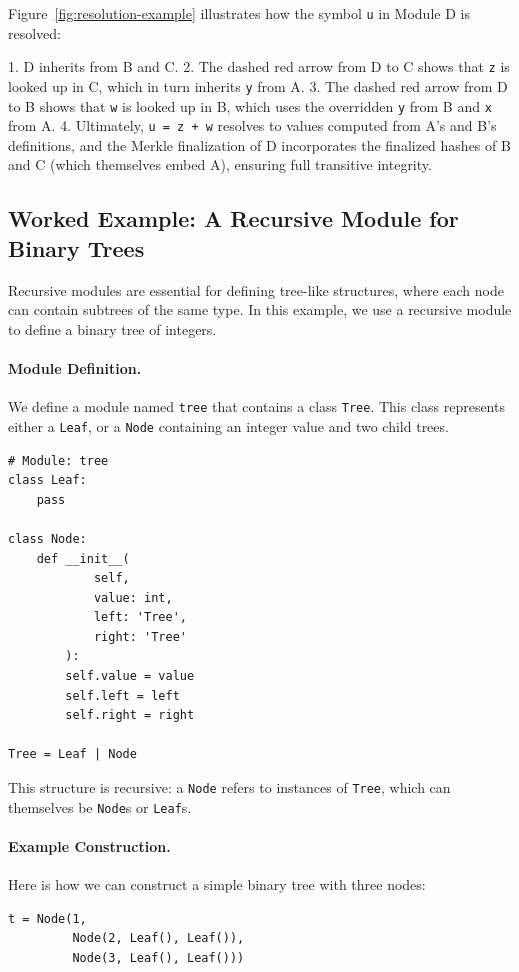 \documentclass[sigplan,screen]{acmart}
\begin{document}
Figure~\ref{fig:resolution-example} illustrates how the symbol \texttt{u} in Module D is resolved:

1. D inherits from B and C.
2. The dashed red arrow from D to C shows that \texttt{z} is looked up in C, which in turn inherits \texttt{y} from A.
3. The dashed red arrow from D to B shows that \texttt{w} is looked up in B, which uses the overridden \texttt{y} from B and \texttt{x} from A.
4. Ultimately, \texttt{u = z + w} resolves to values computed from A's and B's definitions, and the Merkle finalization of D incorporates the finalized hashes of B and C (which themselves embed A), ensuring full transitive integrity.

\subsection{Worked Example: A Recursive Module for Binary Trees}
\label{sec:worked-example-tree}

Recursive modules are essential for defining tree-like structures, where each node can contain subtrees of the same type. In this example, we use a recursive module to define a binary tree of integers.

\paragraph{Module Definition.}
We define a module named \texttt{tree} that contains a class \texttt{Tree}. This class represents either a \texttt{Leaf}, or a \texttt{Node} containing an integer value and two child trees.

\begin{verbatim}
# Module: tree
class Leaf:
	pass

class Node:
	def __init__(
			self,
			value: int,
			left: 'Tree',
			right: 'Tree'
		):
		self.value = value
		self.left = left
		self.right = right

Tree = Leaf | Node
\end{verbatim}

This structure is recursive: a \texttt{Node} refers to instances of \texttt{Tree}, which can themselves be \texttt{Node}s or \texttt{Leaf}s.

\paragraph{Example Construction.}
Here is how we can construct a simple binary tree with three nodes:

\begin{verbatim}
t = Node(1,
		 Node(2, Leaf(), Leaf()),
		 Node(3, Leaf(), Leaf()))
\end{verbatim}
\end{document}
